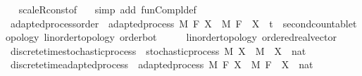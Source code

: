 \begin{isabellebody}
\isadelimproof
\ %
\endisadelimproof
%
\isatagproof
{}\isamarkupfalse%
\ scaleR{\isacharunderscore}{\kern0pt}const{\isacharbrackleft}{\kern0pt}of\ {\isachardoublequoteopen}{\isacharminus}{\kern0pt}{}{\isachardoublequoteclose}{\isacharbrackright}{\kern0pt}\ \isamarkupfalse%
\ {\isacharparenleft}{\kern0pt}simp\ add{\isacharcolon}{\kern0pt}\ fun{\isacharunderscore}{\kern0pt}Compl{\isacharunderscore}{\kern0pt}def{\isacharparenright}{\kern0pt}%
\endisatagproof
{\isafoldproof}%
%
\isadelimproof
%
\endisadelimproof
\isanewline
\isanewline
{}\isamarkupfalse%
\isanewline
\isanewline
{}\isamarkupfalse%
\ adapted{\isacharunderscore}{\kern0pt}process{\isacharunderscore}{\kern0pt}order\ {\isacharequal}{\kern0pt}\ adapted{\isacharunderscore}{\kern0pt}process\ M\ F\ X\ \ M\ F\ \ X\ {\isacharcolon}{\kern0pt}{\isacharcolon}{\kern0pt}\ {\isachardoublequoteopen}{\isacharprime}{\kern0pt}t\ {\isacharcolon}{\kern0pt}{\isacharcolon}{\kern0pt}\ {\isacharbraceleft}{\kern0pt}second{\isacharunderscore}{\kern0pt}countable{\isacharunderscore}{\kern0pt}topology{\isacharcomma}{\kern0pt}\ linorder{\isacharunderscore}{\kern0pt}topology{\isacharcomma}{\kern0pt}\ order{\isacharunderscore}{\kern0pt}bot{\isacharbraceright}{\kern0pt}\ {\isasymRightarrow}\ {\isacharunderscore}{\kern0pt}\ {\isasymRightarrow}\ {\isacharunderscore}{\kern0pt}\ {\isacharcolon}{\kern0pt}{\isacharcolon}{\kern0pt}\ {\isacharbraceleft}{\kern0pt}linorder{\isacharunderscore}{\kern0pt}topology{\isacharcomma}{\kern0pt}\ ordered{\isacharunderscore}{\kern0pt}real{\isacharunderscore}{\kern0pt}vector{\isacharbraceright}{\kern0pt}{\isachardoublequoteclose}%
\isadelimdocument
%
\endisadelimdocument
%
\isatagdocument
%
\isamarkuptrue%
%
\endisatagdocument
{\isafolddocument}%
%
\isadelimdocument
%
\endisadelimdocument
{}\isamarkupfalse%
\ discrete{\isacharunderscore}{\kern0pt}time{\isacharunderscore}{\kern0pt}stochastic{\isacharunderscore}{\kern0pt}process\ {\isacharequal}{\kern0pt}\ stochastic{\isacharunderscore}{\kern0pt}process\ M\ X\ \ M\ \ X\ {\isacharcolon}{\kern0pt}{\isacharcolon}{\kern0pt}\ {\isachardoublequoteopen}nat\ {\isasymRightarrow}\ {\isacharunderscore}{\kern0pt}\ {\isasymRightarrow}\ {\isacharunderscore}{\kern0pt}{\isachardoublequoteclose}\isanewline
{}\isamarkupfalse%
\ discrete{\isacharunderscore}{\kern0pt}time{\isacharunderscore}{\kern0pt}adapted{\isacharunderscore}{\kern0pt}process\ {\isacharequal}{\kern0pt}\ adapted{\isacharunderscore}{\kern0pt}process\ M\ F\ X\ \ M\ F\ \ X\ {\isacharcolon}{\kern0pt}{\isacharcolon}{\kern0pt}\ {\isachardoublequoteopen}nat\ {\isasymRightarrow}\ {\isacharunderscore}{\kern0pt}\ {\isasymRightarrow}\ {\isacharunderscore}{\kern0pt}{\isachardoublequoteclose}\isanewline

\end{isabellebody}
